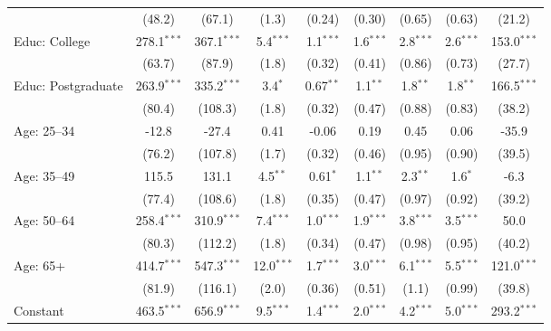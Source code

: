 \begin{adjustbox}{width = \textwidth, center}
\begin{tabular}{lcccccccc}
                              & (48.2)        & (67.1)        & (1.3)        & (0.24)       & (0.30)       & (0.65)      & (0.63)      & (21.2)\\   
      Educ: College           & 278.1$^{***}$ & 367.1$^{***}$ & 5.4$^{***}$  & 1.1$^{***}$  & 1.6$^{***}$  & 2.8$^{***}$ & 2.6$^{***}$ & 153.0$^{***}$\\   
                              & (63.7)        & (87.9)        & (1.8)        & (0.32)       & (0.41)       & (0.86)      & (0.73)      & (27.7)\\   
      Educ: Postgraduate      & 263.9$^{***}$ & 335.2$^{***}$ & 3.4$^{*}$    & 0.67$^{**}$  & 1.1$^{**}$   & 1.8$^{**}$  & 1.8$^{**}$  & 166.5$^{***}$\\   
                              & (80.4)        & (108.3)       & (1.8)        & (0.32)       & (0.47)       & (0.88)      & (0.83)      & (38.2)\\   
      Age: 25--34             & -12.8         & -27.4         & 0.41         & -0.06        & 0.19         & 0.45        & 0.06        & -35.9\\   
                              & (76.2)        & (107.8)       & (1.7)        & (0.32)       & (0.46)       & (0.95)      & (0.90)      & (39.5)\\   
      Age: 35--49             & 115.5         & 131.1         & 4.5$^{**}$   & 0.61$^{*}$   & 1.1$^{**}$   & 2.3$^{**}$  & 1.6$^{*}$   & -6.3\\   
                              & (77.4)        & (108.6)       & (1.8)        & (0.35)       & (0.47)       & (0.97)      & (0.92)      & (39.2)\\   
      Age: 50--64             & 258.4$^{***}$ & 310.9$^{***}$ & 7.4$^{***}$  & 1.0$^{***}$  & 1.9$^{***}$  & 3.8$^{***}$ & 3.5$^{***}$ & 50.0\\   
                              & (80.3)        & (112.2)       & (1.8)        & (0.34)       & (0.47)       & (0.98)      & (0.95)      & (40.2)\\   
      Age: 65+                & 414.7$^{***}$ & 547.3$^{***}$ & 12.0$^{***}$ & 1.7$^{***}$  & 3.0$^{***}$  & 6.1$^{***}$ & 5.5$^{***}$ & 121.0$^{***}$\\   
                              & (81.9)        & (116.1)       & (2.0)        & (0.36)       & (0.51)       & (1.1)       & (0.99)      & (39.8)\\   
      Constant                & 463.5$^{***}$ & 656.9$^{***}$ & 9.5$^{***}$  & 1.4$^{***}$  & 2.0$^{***}$  & 4.2$^{***}$ & 5.0$^{***}$ & 293.2$^{***}$\\   

\end{tabular}
\end{adjustbox}
